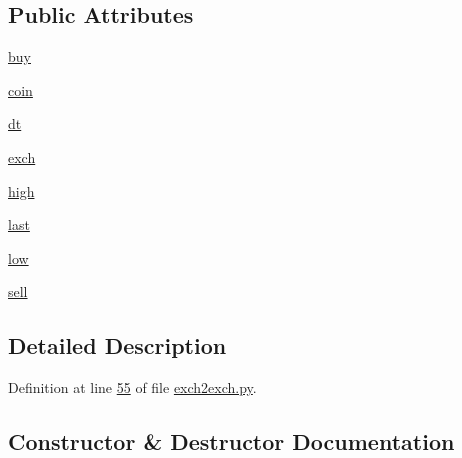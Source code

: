 \subsection*{Public Attributes}
\begin{DoxyCompactItemize}
\item 
\hyperlink{classexch2exch_1_1_xbt_prices_a8f1d8ac0ef114ea3645314578697b7ac}{buy}
\item 
\hyperlink{classexch2exch_1_1_xbt_prices_a1191c8825e8f1333b4100b89fa2be053}{coin}
\item 
\hyperlink{classexch2exch_1_1_xbt_prices_af9f916c683c48631c97f1c5d91447751}{dt}
\item 
\hyperlink{classexch2exch_1_1_xbt_prices_a72caf3a29017a1ceaf4367240a46b360}{exch}
\item 
\hyperlink{classexch2exch_1_1_xbt_prices_aeae6235417d65d9e9c768a51c38d5388}{high}
\item 
\hyperlink{classexch2exch_1_1_xbt_prices_a1da8993986574b27edcaf7259e78c899}{last}
\item 
\hyperlink{classexch2exch_1_1_xbt_prices_a8cef13f833a894d4fc5b8296bb4906fa}{low}
\item 
\hyperlink{classexch2exch_1_1_xbt_prices_a06fd0cfb03d485af3364a0d86fbe5385}{sell}
\end{DoxyCompactItemize}


\subsection{Detailed Description}


Definition at line \hyperlink{exch2exch_8py_source_l00055}{55} of file \hyperlink{exch2exch_8py_source}{exch2exch.\+py}.



\subsection{Constructor \& Destructor Documentation}
\mbox{\label{classexch2exch_1_1_xbt_prices_a1ac4bfa8ff644bc22a369397a5e01caa}} 
